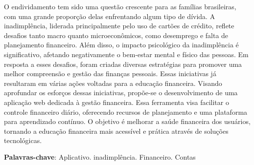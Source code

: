 

	



\setlength{\absparsep}{18pt} %
\begin{resumo}
	\SingleSpacing
    O endividamento tem sido uma questão crescente para as famílias brasileiras, com uma grande proporção delas enfrentando algum tipo de dívida. A inadimplência, liderada principalmente pelo uso de cartões de crédito, reflete desafios tanto macro quanto microeconômicos, como desemprego e falta de planejamento financeiro. Além disso, o impacto psicológico da inadimplência é significativo, afetando negativamente o bem-estar mental e físico das pessoas. Em resposta a esses desafios, foram criadas diversas estratégias para promover uma melhor compreensão e gestão das finanças pessoais. Essas iniciativas já resultaram em várias ações voltadas para a educação financeira. Visando aprofundar os esforços dessas iniciativas, propõe-se o desenvolvimento de uma aplicação web dedicada à gestão financeira. Essa ferramenta visa facilitar o controle financeiro diário, oferecendo recursos de planejamento e uma plataforma para aprendizado contínuo. O objetivo é melhorar a saúde financeira dos usuários, tornando a educação financeira mais acessível e prática através de soluções tecnológicas.
	
	\textbf{Palavras-chave}: Aplicativo. inadimplência. Financeiro. Contas
\end{resumo}

